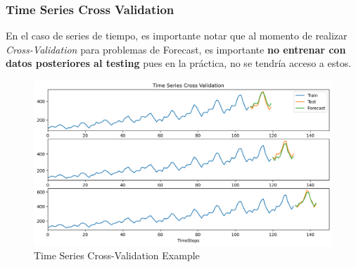 \subsubsection{Time Series Cross Validation}

En el caso de series de tiempo, es importante notar que al momento de realizar \textit{Cross-Validation} para problemas de Forecast, es importante \textbf{no entrenar con datos posteriores al testing} pues en la práctica, no se tendría acceso a estos.

\begin{figure}[H]
    \center
    \includegraphics[scale=0.45]{notebooks/Others/img/time_series_cross_validation.png}
    \caption{Time Series Cross-Validation Example}
\end{figure}








